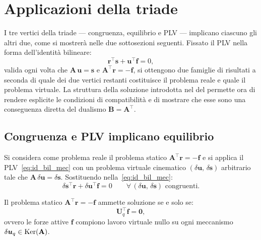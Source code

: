 \section{Applicazioni della triade}	\label{sec:applicazioni_triade}

I tre vertici della triade --- congruenza, equilibrio e PLV
--- implicano ciascuno gli altri due, come si mostrerà nelle
due sottosezioni seguenti. Fissato il PLV nella forma
dell'identità bilineare:
\begin{equation}\label{eq:id_bil_mec_app}
	\bm{r}^{\top}\bm{s} + \bm{u}^{\top}\bm{f} = 0,
\end{equation}
valida ogni volta che $\bm{A}\,\bm{u} = \bm{s}$ e
$\bm{A}^{\top}\bm{r} = -\bm{f}$, si ottengono due famiglie
di risultati a seconda di quale dei due vertici restanti
costituisce il problema reale e quale il problema virtuale.
La struttura della soluzione introdotta nel
 del  permette ora di rendere
esplicite le condizioni di compatibilità e di mostrare che esse sono una conseguenza diretta del dualismo
$\bm{B} = \bm{A}^{\top}$.

\subsection{Congruenza e PLV implicano equilibrio}
\label{sec:con_PLV}

Si considera come problema reale il problema statico
$\bm{A}^{\top}\bm{r} = -\bm{f}$ e si applica il
PLV~\eqref{eq:id_bil_mec} con un problema virtuale
cinematico $(\delta\bm{u},\,\delta\bm{s})$ arbitrario
tale che $\bm{A}\,\delta\bm{u} = \delta\bm{s}$.
Sostituendo nella~\eqref{eq:id_bil_mec}:
\begin{equation}\label{eq:id_bil_stat}
	\delta\bm{s}^{\top}\bm{r} +
	\delta\bm{u}^{\top}\bm{f} = 0
	\qquad
	\forall\,(\delta\bm{u},\,\delta\bm{s})
	\text{ congruenti}.
\end{equation}

\begin{corollario}
	\label{cor:compat_stat}
	Il problema statico $\bm{A}^{\top}\bm{r} = -\bm{f}$
	ammette soluzione se e solo se:
	\begin{equation}\label{eq:compat_stat}
		\bm{U}_q^{\top}\bm{f} = \bm{0},
	\end{equation}
	ovvero le forze attive $\bm{f}$ compiono lavoro virtuale
	nullo su ogni meccanismo $\delta\bm{u}_q \in \operatorname{Ker}(\mathbf{A})$.
\end{corollario}

